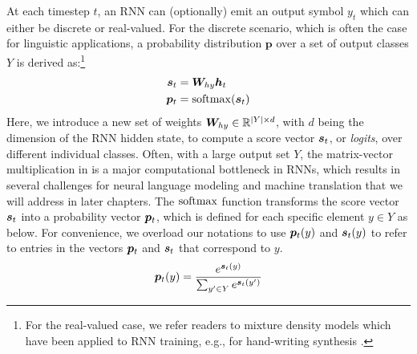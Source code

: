 At each timestep $t$, an RNN can (optionally) emit an output symbol
$y_t$ which can either be discrete or real-valued. For the discrete scenario,
which is often the case for linguistic applications, a probability distribution $\bm{p}$ over a 
set of output classes $Y$ is derived as:\footnote{For the real-valued case, we refer readers to mixture density
models \cite{bishop94} which have been applied to RNN training, e.g., for
hand-writing synthesis \cite{graves13c}.}
\begin{align}
\bm{s}_{t} &= \bm{W}_{hy}\bm{h}_{t} \label{e:score} \\
\bm{p}_{t} &= \operatorname{softmax}(\bm{s}_{t}) \label{e:prob}
\end{align}
Here, we introduce a new set of weights $\bm{W}_{hy} \in \mathbb{R}^{|Y| \times d}$, with $d$ being the dimension of the RNN hidden
state, to compute a score vector $\bm{s}_{t}$, or {\it logits}, over
different individual classes. Often, with a large output set $Y$, the
matrix-vector multiplication in  is a major computational
bottleneck in RNNs, which results in several challenges for neural language modeling
and machine translation that we will address in later chapters. 
The $\operatorname{softmax}$ function transforms the score
vector $\bm{s}_{t}$ into a probability vector $\bm{p}_{t}$, which is defined for each specific
element $y \in Y$ as below.
For convenience, we overload our notations to use $\bm{p}_{t}(y)$ and $\bm{s}_{t}(y)$ to refer to entries in
the vectors $\bm{p}_{t}$ and $\bm{s}_{t}$ that correspond to $y$.
\begin{align}
\bm{p}_{t}(y) = \frac{e^{\bm{s}_{t}(y)}}{\sum_{y' \in Y} e^{\bm{s}_{t}(y')}}
\label{e:softmax}
\end{align}

